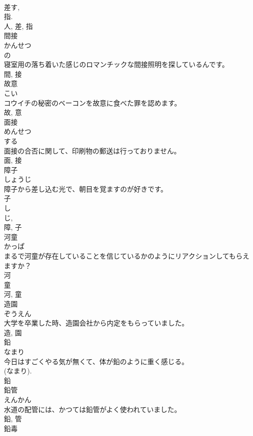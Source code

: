 \documentclass[8pt]{extreport}
\begin{document}
\begin{CJK}{UTF8}{min}
\\	差す, 
\\	指. 
\\	人, 差, 指	
\\	間接	
\\	かんせつ	
\\	の 
\\	寝室用の落ち着いた感じのロマンチックな間接照明を探しているんです。	
\\	間, 接	
\\	故意	
\\	こい	
\\	コウイチの秘密のベーコンを故意に食べた罪を認めます。	
\\	故, 意	
\\	面接	
\\	めんせつ	
\\	する 
\\	面接の合否に関して、印刷物の郵送は行っておりません。	
\\	面, 接	
\\	障子	
\\	しょうじ	
\\	障子から差し込む光で、朝目を覚ますのが好きです。	
\\	子 
\\	し 
\\	じ, 
\\	障, 子	
\\	河童	
\\	かっぱ	
\\	まるで河童が存在していることを信じているかのようにリアクションしてもらえますか？	
\\	河 
\\	童 
\\	河, 童	
\\	造園	
\\	ぞうえん	
\\	大学を卒業した時、造園会社から内定をもらっていました。	
\\	造, 園	
\\	鉛	
\\	なまり	
\\	今日はすごくやる気が無くて、体が鉛のように重く感じる。	
\\	(なまり).
\\	鉛	
\\	鉛管	
\\	えんかん	
\\	水道の配管には、かつては鉛管がよく使われていました。	
\\	鉛, 管	
\\	鉛毒	

\end{CJK}
\end{document}
